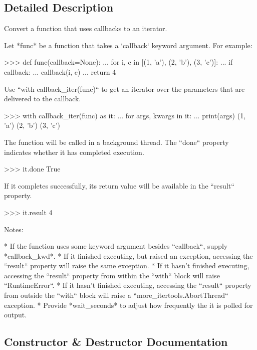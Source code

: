 \subsection{Detailed Description}
\begin{DoxyVerb}Convert a function that uses callbacks to an iterator.

Let *func* be a function that takes a `callback` keyword argument.
For example:

>>> def func(callback=None):
...     for i, c in [(1, 'a'), (2, 'b'), (3, 'c')]:
...         if callback:
...             callback(i, c)
...     return 4


Use ``with callback_iter(func)`` to get an iterator over the parameters
that are delivered to the callback.

>>> with callback_iter(func) as it:
...     for args, kwargs in it:
...         print(args)
(1, 'a')
(2, 'b')
(3, 'c')

The function will be called in a background thread. The ``done`` property
indicates whether it has completed execution.

>>> it.done
True

If it completes successfully, its return value will be available
in the ``result`` property.

>>> it.result
4

Notes:

* If the function uses some keyword argument besides ``callback``, supply
  *callback_kwd*.
* If it finished executing, but raised an exception, accessing the
  ``result`` property will raise the same exception.
* If it hasn't finished executing, accessing the ``result``
  property from within the ``with`` block will raise ``RuntimeError``.
* If it hasn't finished executing, accessing the ``result`` property from
  outside the ``with`` block will raise a
  ``more_itertools.AbortThread`` exception.
* Provide *wait_seconds* to adjust how frequently the it is polled for
  output.\end{DoxyVerb}
 

\subsection{Constructor \& Destructor Documentation}
\mbox{\label{classsetuptools_1_1__vendor_1_1more__itertools_1_1more_1_1callback__iter_a025217221fec8d40aca9a6515267562f}} 
